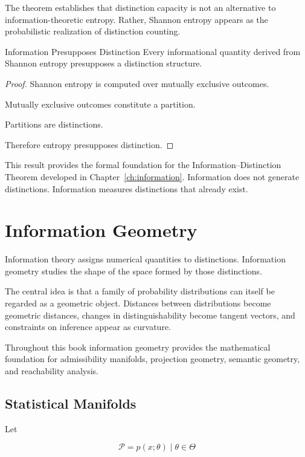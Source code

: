 \documentclass[12pt,twoside,openright]{book}
\begin{document}
The theorem establishes that distinction capacity is not an alternative to information-theoretic entropy. Rather, Shannon entropy appears as the probabilistic realization of distinction counting.

\begin{corollary}{Information Presupposes Distinction}
Every informational quantity derived from Shannon entropy presupposes a distinction structure.
\end{corollary}

\begin{proof}
Shannon entropy is computed over mutually exclusive outcomes.

Mutually exclusive outcomes constitute a partition.

Partitions are distinctions.

Therefore entropy presupposes distinction.
\end{proof}

This result provides the formal foundation for the Information--Distinction Theorem developed in Chapter~\ref{ch:information}. Information does not generate distinctions. Information measures distinctions that already exist.

\section{Information Geometry}

Information theory assigns numerical quantities to
distinctions. Information geometry studies the shape of the
space formed by those distinctions.

The central idea is that a family of probability
distributions can itself be regarded as a geometric object.
Distances between distributions become geometric distances,
changes in distinguishability become tangent vectors, and
constraints on inference appear as curvature.

Throughout this book information geometry provides the
mathematical foundation for admissibility manifolds,
projection geometry, semantic geometry, and reachability
analysis.

\subsection{Statistical Manifolds}

Let

\[
\mathcal P
=

{p(x;\theta)\mid \theta\in\Theta}
\]
\end{document}
